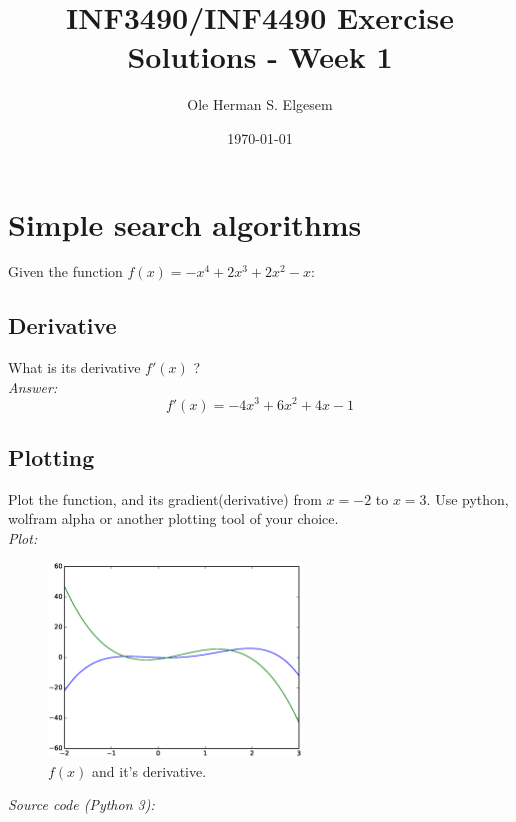 \documentclass{article}           %
\title{\vspace{-2cm}INF3490/INF4490 Exercise Solutions - Week 1}
\author{Ole Herman S. Elgesem}
\date{\today}
\newcommand\marginsymbol[1][0pt]{%
  \tabto*{0cm}\makebox[\dimexpr-1cm-#1\relax][r]{$\mathbb{P}$}\tabto*{\TabPrevPos}}
\begin{document}
    \renewcommand\marginsymbol[1][0pt]{%
  \tabto*{0cm}\makebox[-1cm][c]{$\mathbb{P}$}\tabto*{\TabPrevPos}}

\maketitle


\section{Simple search algorithms}

Given the function \(f(x) = -x^4 + 2x^3 + 2x^2 - x\):

\subsection{Derivative}
What is its derivative \(f'(x)\) ?\\

\emph{Answer:}
\[f'(x) = -4x^3 + 6x^2 + 4x - 1\]

\subsection{Plotting \marginsymbol}
Plot the function, and its gradient(derivative) from \(x=-2\) to \(x=3\). Use
python, wolfram alpha or another plotting tool of your choice.\\

\emph{Plot:}
\begin{figure}[H]
\begin{center}
\includegraphics[width=0.6\textwidth]{eps/w1e1b.eps}
\caption{\(f(x)\) and it's derivative.}
\label{fig:w1e1b}
\end{center}
\end{figure}

\emph{Source code (Python 3):}
\inputminted{Python}{py/w1e1b.py}
\end{document}
